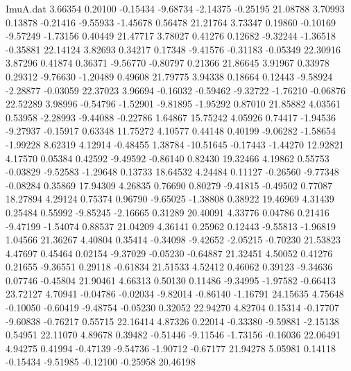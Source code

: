 \begin{filecontents}{ImuA.dat}
   3.66354    0.20100   -0.15434   -9.68734   -2.14375   -0.25195   21.08788
   3.70993    0.13878   -0.21416   -9.55933   -1.45678    0.56478   21.21764
   3.73347    0.19860   -0.10169   -9.57249   -1.73156    0.40449   21.47717
   3.78027    0.41276    0.12682   -9.32244   -1.36518   -0.35881   22.14124
   3.82693    0.34217    0.17348   -9.41576   -0.31183   -0.05349   22.30916
   3.87296    0.41874    0.36371   -9.56770   -0.80797    0.21366   21.86645
   3.91967    0.33978    0.29312   -9.76630   -1.20489    0.49608   21.79775
   3.94338    0.18664    0.12443   -9.58924   -2.28877   -0.03059   22.37023
   3.96694   -0.16032   -0.59462   -9.32722   -1.76210   -0.06876   22.52289
   3.98996   -0.54796   -1.52901   -9.81895   -1.95292    0.87010   21.85882
   4.03561    0.53958   -2.28993   -9.44088   -0.22786    1.64867   15.75242
   4.05926    0.74417   -1.94536   -9.27937   -0.15917    0.63348   11.75272
   4.10577    0.44148    0.40199   -9.06282   -1.58654   -1.99228    8.62319
   4.12914   -0.48455    1.38784  -10.51645   -0.17443   -1.44270   12.92821
   4.17570    0.05384    0.42592   -9.49592   -0.86140    0.82430   19.32466
   4.19862    0.55753   -0.03829   -9.52583   -1.29648    0.13733   18.64532
   4.24484    0.11127   -0.26560   -9.77348   -0.08284    0.35869   17.94309
   4.26835    0.76690    0.80279   -9.41815   -0.49502    0.77087   18.27894
   4.29124    0.75374    0.96790   -9.65025   -1.38808    0.38922   19.46969
   4.31439    0.25484    0.55992   -9.85245   -2.16665    0.31289   20.40091
   4.33776    0.04786    0.21416   -9.47199   -1.54074    0.88537   21.04209
   4.36141    0.25962    0.12443   -9.55813   -1.96819    1.04566   21.36267
   4.40804    0.35414   -0.34098   -9.42652   -2.05215   -0.70230   21.53823
   4.47697    0.45464    0.02154   -9.37029   -0.05230   -0.64887   21.32451
   4.50052    0.41276    0.21655   -9.36551    0.29118   -0.61834   21.51533
   4.52412    0.46062    0.39123   -9.34636    0.07746   -0.45804   21.90461
   4.66313    0.50130    0.11486   -9.34995   -1.97582   -0.66413   23.72127
   4.70941   -0.04786   -0.02034   -9.82014   -0.86140   -1.16791   24.15635
   4.75648   -0.10050   -0.60419   -9.48754   -0.05230    0.32052   22.94270
   4.82704    0.15314   -0.17707   -9.60838   -0.76217    0.55715   22.16414
   4.87326    0.22014   -0.33380   -9.59881   -2.15138    0.54951   22.11070
   4.89678    0.39482   -0.51446   -9.11546   -1.73156   -0.16036   22.06491
   4.94275    0.41994   -0.47139   -9.54736   -1.90712   -0.67177   21.94278
   5.05981    0.14118   -0.15434   -9.51985   -0.12100   -0.25958   20.46198

\end{filecontents}
